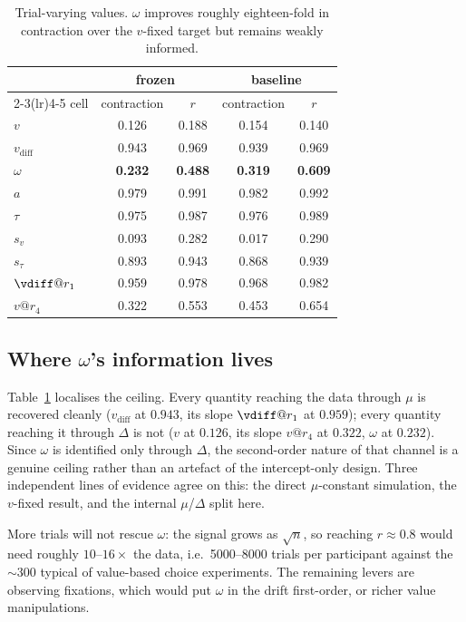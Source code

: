 \documentclass[11pt]{article}
\newcommand{\vdiff}{v_{\mathrm{diff}}}
\newcommand{\Dch}{\Delta}
\begin{document}
\begin{table}[h]
\centering
\begin{tabular}{l cc cc}
\toprule
& \multicolumn{2}{c}{frozen} & \multicolumn{2}{c}{baseline} \\
\cmidrule(lr){2-3}\cmidrule(lr){4-5}
cell & contraction & $r$ & contraction & $r$ \\
\midrule
$v$              & 0.126 & 0.188 & 0.154 & 0.140 \\
$\vdiff$         & 0.943 & 0.969 & 0.939 & 0.969 \\
$\omega$         & \textbf{0.232} & \textbf{0.488} & \textbf{0.319} & \textbf{0.609} \\
$a$              & 0.979 & 0.991 & 0.982 & 0.992 \\
$\tau$           & 0.975 & 0.987 & 0.976 & 0.989 \\
$s_v$            & 0.093 & 0.282 & 0.017 & 0.290 \\
$s_\tau$         & 0.893 & 0.943 & 0.868 & 0.939 \\
$\vdiff@r_1$     & 0.959 & 0.978 & 0.968 & 0.982 \\
$v@r_4$          & 0.322 & 0.553 & 0.453 & 0.654 \\
\bottomrule
\end{tabular}
\caption{Trial-varying values. $\omega$ improves roughly eighteen-fold in contraction
over the $v$-fixed target but remains weakly informed.}
\label{tab:varying}
\end{table}

\subsection{Where $\omega$'s information lives}

Table~\ref{tab:varying} localises the ceiling. Every quantity reaching the data through
$\mu$ is recovered cleanly ($\vdiff$ at $0.943$, its slope $\vdiff@r_1$ at $0.959$);
every quantity reaching it through $\Dch$ is not ($v$ at $0.126$, its slope $v@r_4$ at
$0.322$, $\omega$ at $0.232$). Since $\omega$ is identified only through $\Dch$, the
second-order nature of that channel is a genuine ceiling rather than an artefact of the
intercept-only design. Three independent lines of evidence agree on this: the direct
$\mu$-constant simulation, the $v$-fixed result, and the internal $\mu$/$\Dch$ split
here.

More trials will not rescue $\omega$: the signal grows as $\sqrt{n}$, so reaching
$r \approx 0.8$ would need roughly $10$--$16\times$ the data, i.e.\ 5000--8000 trials
per participant against the $\sim$300 typical of value-based choice experiments. The
remaining levers are observing fixations, which would put $\omega$ in the drift
first-order, or richer value manipulations.
\end{document}
